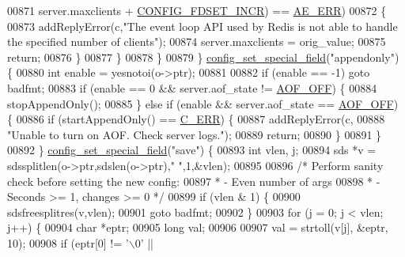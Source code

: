 \begin{DoxyCode}
{{{{{{{00871                     server.maxclients + \hyperlink{server_8h_a6725c1ff5b6a17f930627263f484d107}{CONFIG\_FDSET\_INCR}) == 
      \hyperlink{ae_8h_aa16dcf7effdf8f8df97f51b1cb51a9df}{AE\_ERR})
00872                 \{
00873                     addReplyError(c,\textcolor{stringliteral}{"The event loop API used by Redis is not able to handle the
       specified number of clients"});
00874                     server.maxclients = orig\_value;
00875                     \textcolor{keywordflow}{return};
00876                 \}
00877             \}
00878         \}
00879     \} \hyperlink{config_8c_a7bdda941057dd2668e0e5b5df1d3ab4c}{config\_set\_special\_field}(\textcolor{stringliteral}{"appendonly"}) \{
00880         \textcolor{keywordtype}{int} enable = yesnotoi(o->ptr);
00881 
00882         \textcolor{keywordflow}{if} (enable == -1) \textcolor{keywordflow}{goto} badfmt;
00883         \textcolor{keywordflow}{if} (enable == 0 && server.aof\_state != \hyperlink{server_8h_a5226306fbcebcb6d5d02e0fef3c213c2}{AOF\_OFF}) \{
00884             stopAppendOnly();
00885         \} \textcolor{keywordflow}{else} \textcolor{keywordflow}{if} (enable && server.aof\_state == \hyperlink{server_8h_a5226306fbcebcb6d5d02e0fef3c213c2}{AOF\_OFF}) \{
00886             \textcolor{keywordflow}{if} (startAppendOnly() == \hyperlink{server_8h_af98ac28d5f4d23d7ed5985188e6fb7d1}{C\_ERR}) \{
00887                 addReplyError(c,
00888                     \textcolor{stringliteral}{"Unable to turn on AOF. Check server logs."});
00889                 \textcolor{keywordflow}{return};
00890             \}
00891         \}
00892     \} \hyperlink{config_8c_a7bdda941057dd2668e0e5b5df1d3ab4c}{config\_set\_special\_field}(\textcolor{stringliteral}{"save"}) \{
00893         \textcolor{keywordtype}{int} vlen, j;
00894         sds *v = sdssplitlen(o->ptr,sdslen(o->ptr),\textcolor{stringliteral}{" "},1,&vlen);
00895 
00896         \textcolor{comment}{/* Perform sanity check before setting the new config:}
00897 \textcolor{comment}{         * - Even number of args}
00898 \textcolor{comment}{         * - Seconds >= 1, changes >= 0 */}
00899         \textcolor{keywordflow}{if} (vlen & 1) \{
00900             sdsfreesplitres(v,vlen);
00901             \textcolor{keywordflow}{goto} badfmt;
00902         \}
00903         \textcolor{keywordflow}{for} (j = 0; j < vlen; j++) \{
00904             \textcolor{keywordtype}{char} *eptr;
00905             \textcolor{keywordtype}{long} val;
00906 
00907             val = strtoll(v[j], &eptr, 10);
00908             \textcolor{keywordflow}{if} (eptr[0] != \textcolor{stringliteral}{'\(\backslash\)0'} ||
}}}}}}}
\end{DoxyCode}
